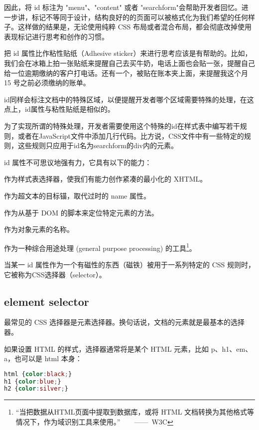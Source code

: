 因此，将 id 标注为 "menu"、"content" 或者 "searchform"会帮助开发者回忆。进一步讲，标记不等同于设计，结构良好的的页面可以被格式化为我们希望的任何样子。这样做的结果是，无论使用纯粹 CSS 布局或者混合布局，都会彻底改掉使用表现标记进行思考和创作的习惯。

把 id 属性比作粘性贴纸（Adhesive sticker）来进行思考应该是有帮助的。比如，我们会在冰箱上拍一张贴纸来提醒自己去买牛奶，电话上面也会贴一张，提醒自己给一位逾期缴纳的客户打电话。还有一个，被贴在账本夹上面，来提醒我这个月 15 号之前必须缴纳的账单。

id同样会标注文档中的特殊区域，以便提醒开发者哪个区域需要特殊的处理，在这点上，id属性与粘性贴纸是相似的。

为了实现所谓的特殊处理，开发者需要使用这个特殊的id在样式表中编写若干规则，或者在JavaScript文件中添加几行代码。比方说，CSS文件中有一些特定的规则，这些规则只应用于id名为searchform的div内的元素。

id 属性不可思议地强有力，它具有以下的能力：

\begin{compactitem}
\item 作为样式表选择器，使我们有能力创作紧凑的最小化的 XHTML。
\item 作为超文本的目标锚，取代过时的 name 属性。
\item 作为从基于 DOM 的脚本来定位特定元素的方法。
\item 作为对象元素的名称。
\item 作为一种综合用途处理 (general purpose processing) 的工具\footnote{“当把数据从HTML页面中提取到数据库，或将 HTML 文档转换为其他格式等情况下，作为域识别工具来使用。”$\qquad$——~W3C}。
\end{compactitem}

当某一 id 属性作为一个有磁性的东西（磁铁）被用于一系列特定的 CSS 规则时，它被称为CSS选择器（selector）。


\subsection{element selector}


最常见的 CSS 选择器是元素选择器。换句话说，文档的元素就是最基本的选择器。

如果设置 HTML 的样式，选择器通常将是某个 HTML 元素，比如 p、h1、em、a，也可以是 html 本身：

\begin{lstlisting}[language=CSS]
html {color:black;}
h1 {color:blue;}
h2 {color:silver;}
\end{lstlisting}



